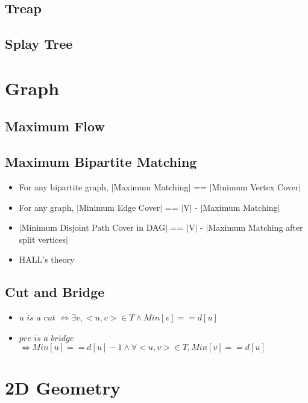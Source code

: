 \documentclass[twoside]{article}
\begin{document}
		\subsection{Treap}
			
		\subsection{Splay Tree}
			
	\newpage
	\section{Graph}
		\subsection{Maximum Flow}
			
		\newpage
		\subsection{Maximum Bipartite Matching}
			
			\begin{itemize}
				\item For any bipartite graph, $|$Maximum Matching$|$ == $|$Minimum Vertex Cover$|$
				\item For any graph, $|$Minimum Edge Cover$|$ == $|$V$|$ - $|$Maximum Matching$|$
				\item $|$Minimum Disjoint Path Cover in DAG$|$ == $|$V$|$ - $|$Maximum Matching after split vertices$|$
				\item HALL's theory
			\end{itemize}
		\newpage
		\subsection{Cut and Bridge}
			
			\begin{itemize}
				\item $u$ $is$ $a$ $cut$ $\Leftrightarrow \exists v, <u, v> \in T \wedge Min[v] == d[u]$
				\item $pre$ $is$ $a$ $bridge$ $\Leftrightarrow Min[u] == d[u] - 1 \wedge \forall <u, v> \in T, Min[v] == d[u]$
			\end{itemize}
			
	\newpage
	\section{2D Geometry}
\end{document}
